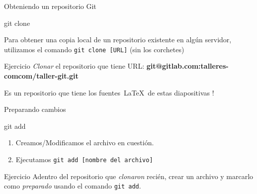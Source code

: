 \begin{frame}[t]{Obteniendo un repositorio Git}

    \begin{comando}
        git clone
    \end{comando}

    \pause
	\begin{block}{}
        Para obtener una copia local de un repositorio existente en algún servidor,
        utilizamos el comando \texttt{git clone [URL]} (sin los corchetes)
    \end{block}

    \pause
    \vspace{1em}
    \begin{ejercicio}{Ejercicio}
        \textit{Clonar} el repositorio que tiene URL: \textbf{git@gitlab.com:talleres-comcom/taller-git.git}

        \vspace{0.5em}
        Es un repositorio que tiene los fuentes\ \LaTeX\ de estas diapositivas !
    \end{ejercicio}
\end{frame}

\begin{frame}[t]{Preparando cambios}

    \begin{comando}
        git add
    \end{comando}

    \pause
    \begin{block}{}
        \begin{enumerate}
            \item Creamos/Modificamos el archivo en cuestión.
            \item Ejecutamos \texttt{git add [nombre del archivo]}
        \end{enumerate}
    \end{block}

    \pause
    \vspace{1em}
    \begin{ejercicio}{Ejercicio}
        Adentro del repositorio que \textit{clonaron} recién, crear un archivo y
        marcarlo como \textit{preparado} usando el comando \texttt{git add}.
    \end{ejercicio}

\end{frame}

